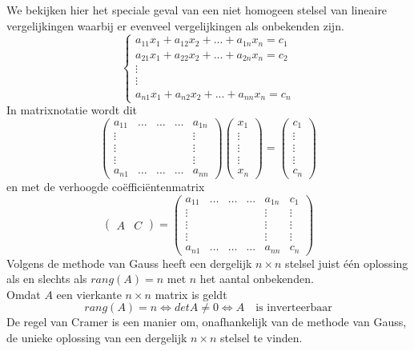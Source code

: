 We bekijken hier het speciale geval van een niet homogeen stelsel van lineaire vergelijkingen waarbij er evenveel vergelijkingen als onbekenden zijn. 
\[ 
\left\{ \begin{array}{l}
a_{11} x_1 + a_{12} x_2 + ... + a_{1n} x_n = c_1 \\
a_{21} x_1 + a_{22} x_2 + ... + a_{2n} x_n = c_2 \\
\vdots \\ \vdots \\
a_{n1} x_1 + a_{n2} x_2 + ... + a_{nn} x_n = c_n
\end{array}
\right.
\]
In matrixnotatie wordt dit
\[ 
\left( \begin{matrix} a_{11} & \ldots & \ldots & \ldots & a_{1n} \\ \vdots & & & & \vdots \\ \vdots & & & & \vdots \\ \vdots & & & & \vdots \\ a_{n1} & \ldots & \ldots & \ldots & a_{nn} \end{matrix} \right) \left( \begin{matrix} x_1 \\ \vdots \\ \vdots \\ \vdots \\ x_n \end{matrix} \right) = \left( \begin{matrix} c_1 \\ \vdots \\ \vdots \\ \vdots \\ c_n \end{matrix} \right)
\]
en met de verhoogde co\"{e}ffici\"{e}ntenmatrix
\[
\left( \begin{array}{c|c} A & C \end{array} \right) =
\left( 
\begin{array}{ccccc|c}
a_{11} & \ldots & \ldots & \ldots & a_{1n} & c_1 \\ \vdots & & & & \vdots & \vdots \\ \vdots & & & & \vdots & \vdots \\ \vdots & & & & \vdots & \vdots \\ a_{n1} & \ldots & \ldots & \ldots & a_{nn} & c_n
\end{array} 
\right)
\]
Volgens de methode van Gauss heeft een dergelijk $n \times n$ stelsel juist \'{e}\'{e}n oplossing als en slechts als $rang(A)=n$ met $n$ het aantal onbekenden.\\
Omdat $A$ een vierkante $n \times n$ matrix is geldt
\[ rang(A)=n \Leftrightarrow det A \neq 0 \Leftrightarrow A \quad \textrm{is inverteerbaar} \]
De regel van Cramer is een manier om, onafhankelijk van de methode van Gauss, de unieke oplossing van een dergelijk $n \times n$ stelsel te vinden. \\

